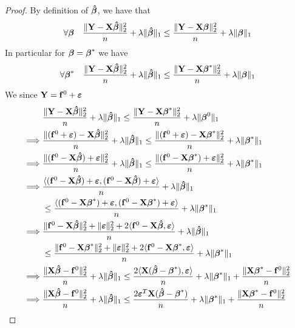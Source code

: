 \begin{proof}
    By definition of $\boldsymbol{\hat{\beta}}$, we have that
    $$
        \forall \boldsymbol{\beta} \quad \frac{\| \mathbf{Y} -\mathbf{X} \boldsymbol{\hat{\beta}} \|_{2}^{2}}{n} + \lambda \| \boldsymbol{\hat{\beta}} \|_{1} \leq \frac{\|\mathbf{Y}-\mathbf{X} \boldsymbol{\beta} \|_{2}^{2}}{n}+\lambda \| \boldsymbol{\beta} \|_{1}
    $$
    In particular for $\boldsymbol{\beta} = \boldsymbol{\beta}^*$ we have
    $$
        \forall \boldsymbol{\beta}^* \quad \frac{\| \mathbf{Y} -\mathbf{X} \boldsymbol{\hat{\beta}} \|_{2}^{2}}{n} + \lambda \| \boldsymbol{\hat{\beta}} \|_{1} \leq \frac{\|\mathbf{Y}-\mathbf{X} \boldsymbol{\beta}^* \|_{2}^{2}}{n}+\lambda \| \boldsymbol{\beta} \|_{1}
    $$
    We since $\mathbf{Y} = \mathbf{f}^0 + \boldsymbol{\varepsilon}$
    \begin{align*}
                 & \frac{\|\mathbf{Y}  - \mathbf{X} \boldsymbol{\hat{\beta}} \|_{2}^{2}}{n} + \lambda \| \boldsymbol{\hat{\beta}}\|_{1} \leq \frac{\| \mathbf{Y}  - \mathbf{X} \boldsymbol{\beta}^* \|_2^2}{n}+\lambda\|\boldsymbol{\beta}^{0}\|_{1}                                                                     \\
        \implies &
        \frac{\| (\mathbf{f}^0 + \boldsymbol{\varepsilon}) - \mathbf{X} \boldsymbol{\hat{\beta}} \|_{2}^{2}}{n} + \lambda\| \boldsymbol{\hat{\beta}} \|_{1} \leq \frac{ \| (\mathbf{f}^0 + \boldsymbol{\varepsilon})-\mathbf{X} \boldsymbol{\beta}^*\|_{2}^{2}}{n}+\lambda \| \boldsymbol{\beta}^*\|_{1}                                         \\
        \implies &
        \frac{\| (\mathbf{f}^0 - \mathbf{X} \boldsymbol{\hat{\beta}} ) + \boldsymbol{\varepsilon} \|_{2}^{2}}{n} + \lambda\| \boldsymbol{\hat{\beta}} \|_{1} \leq \frac{ \| (\mathbf{f}^0 - \mathbf{X} \boldsymbol{\beta}^*) + \boldsymbol{\varepsilon} \|_{2}^{2}}{n}+\lambda \| \boldsymbol{\beta}^*\|_{1}                                     \\
        \implies &
        \frac{\langle (\mathbf{f}^0 - \mathbf{X} \boldsymbol{\hat{\beta}} ) + \boldsymbol{\varepsilon}, (\mathbf{f}^0 - \mathbf{X} \boldsymbol{\hat{\beta}} ) + \boldsymbol{\varepsilon} \rangle}{n} + \lambda\| \boldsymbol{\hat{\beta}} \|_{1}                                                                                      \\
                 & \leq \frac{ \langle (\mathbf{f}^0 - \mathbf{X} \boldsymbol{\beta}^*) + \boldsymbol{\varepsilon}, (\mathbf{f}^0 - \mathbf{X} \boldsymbol{\beta}^*) + \boldsymbol{\varepsilon} \rangle}{n}+\lambda \| \boldsymbol{\beta}^*\|_{1}                                                                            \\
        \implies &
        \frac{\|\mathbf{f}^0 - \mathbf{X} \boldsymbol{\hat{\beta}} \|_{2}^{2} + \| \boldsymbol{\varepsilon} \|_{2}^{2} + 2\langle \mathbf{f}^0 - \mathbf{X} \boldsymbol{\hat{\beta}}, \boldsymbol{\varepsilon} \rangle}{n} + \lambda\| \boldsymbol{\hat{\beta}} \|_{1}                                                                \\
                 & \leq \frac{\|\mathbf{f}^0 - \mathbf{X} \boldsymbol{\beta}^* \|_{2}^{2} + \| \boldsymbol{\varepsilon} \|_{2}^{2} + 2\langle \mathbf{f}^0 - \mathbf{X} \boldsymbol{\beta}^*, \boldsymbol{\varepsilon} \rangle}{n}+\lambda \| \boldsymbol{\beta}^*\|_{1}                                                     \\
        \implies &
        \frac{\|\mathbf{X} \boldsymbol{\hat{\beta}} - \mathbf{f}^0 \|_{2}^{2}}{n} + \lambda\| \boldsymbol{\hat{\beta}} \|_{1} \leq \frac{2\langle \mathbf{X} (\boldsymbol{\hat{\beta}} - \boldsymbol{\beta}^*), \boldsymbol{\varepsilon} \rangle}{n} + \lambda \| \boldsymbol{\beta}^*\|_{1} + \frac{\|\mathbf{X} \boldsymbol{\beta}^* - \mathbf{f}^0\|_{2}^{2}}{n} \\
        \implies &
        \frac{\|\mathbf{X} \boldsymbol{\hat{\beta}} - \mathbf{f}^0 \|_{2}^{2}}{n} + \lambda\| \boldsymbol{\hat{\beta}} \|_{1} \leq \frac{2 \boldsymbol{\varepsilon}^T \mathbf{X} (\boldsymbol{\hat{\beta}} - \boldsymbol{\beta}^*)}{n} + \lambda \| \boldsymbol{\beta}^*\|_{1} + \frac{\|\mathbf{X} \boldsymbol{\beta}^* - \mathbf{f}^0\|_{2}^{2}}{n}               \\
    \end{align*}
\end{proof}

